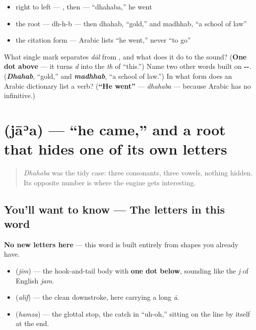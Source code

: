 \begin{itemize}
\raggedright
  \item right to left — , then  — \textquotedblleft{}dhahaba,\textquotedblright{} he went
  \item the root — dh-h-b — then dhahab, \textquotedblleft{}gold,\textquotedblright{} and madhhab, \textquotedblleft{}a school of law\textquotedblright{}
  \item the citation form — Arabic lists \textquotedblleft{}he went,\textquotedblright{} never \textquotedblleft{}to go\textquotedblright{}
\end{itemize}

\begin{tcolorbox}[breakable,colback=teal!4,colframe=teal!35!black,title={Before you move on}]
What single mark separates \emph{dāl} from \textbf{}, and what does it do to the sound? (\textbf{One dot above} — it turns \emph{d} into the \emph{th} of \textquotedblleft{}this.\textquotedblright{}) Name two other words built on \textbf{--}. (\emph{\textbf{Dhahab}}, \textquotedblleft{}gold,\textquotedblright{} and \emph{\textbf{madhhab}}, \textquotedblleft{}a school of law.\textquotedblright{}) In what form does an Arabic dictionary list a verb? (\textbf{\textquotedblleft{}He went\textquotedblright{}} — \emph{dhahaba} — because Arabic has no infinitive.)
\end{tcolorbox}
\section[\texorpdfstring{\ar{جاء} (jāʾa)}{جاء (jāʾa)}]{ (jāʾa) — \textquotedblleft{}he came,\textquotedblright{} and a root that hides one of its own letters}

\label{lesson:AR-C28-jaa}



\begin{quote}
\emph{Dhahaba} was the tidy case: three consonants, three vowels, nothing hidden. Its opposite number is where the engine gets interesting.
\end{quote}

\subsection*{You'll want to know — The letters in this word}
\textbf{No new letters here} — this word is built entirely from shapes you already have.

\begin{itemize}
\raggedright
  \item \textbf{} (\emph{jīm}) — the hook-and-tail body with \textbf{one dot below}, sounding like the \emph{j} of English \emph{jam}.
  \item \textbf{} (\emph{alif}) — the clean downstroke, here carrying a long \emph{ā}.
  \item \textbf{} (\emph{hamza}) — the glottal stop, the catch in \textquotedblleft{}uh-oh,\textquotedblright{} sitting on the line by itself at the end.
\end{itemize}

